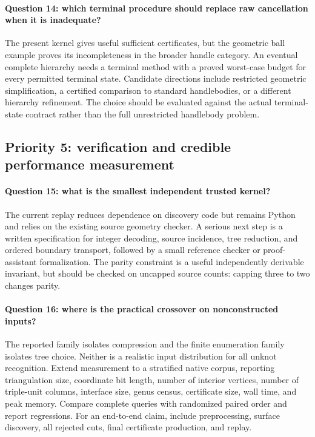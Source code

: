 \paragraph{Question 14: which terminal procedure should replace raw
cancellation when it is inadequate?}
The present kernel gives useful sufficient certificates, but the geometric
ball example proves its incompleteness in the broader handle category.
An eventual complete hierarchy needs a terminal method with a proved
worst-case budget for every permitted terminal state.  Candidate directions
include restricted geometric simplification, a certified comparison to
standard handlebodies, or a different hierarchy refinement.  The choice
should be evaluated against the actual terminal-state contract rather
than the full unrestricted handlebody problem.

\subsection{Priority 5: verification and credible performance measurement}
\paragraph{Question 15: what is the smallest independent trusted kernel?}
The current replay reduces dependence on discovery code but remains Python
and relies on the existing source geometry checker.  A serious next step
is a written specification for integer decoding, source incidence,
tree reduction, and ordered boundary transport, followed by a small
reference checker or proof-assistant formalization.  The parity constraint
is a useful independently derivable invariant, but should be checked on
uncapped source counts: capping three to two changes parity.

\paragraph{Question 16: where is the practical crossover on nonconstructed
inputs?}
The reported family isolates compression and the finite enumeration
family isolates tree choice.  Neither is a realistic input distribution
for all unknot recognition.  Extend measurement to a stratified native
corpus, reporting triangulation size, coordinate bit length, number of
interior vertices, number of triple-unit columns, interface size, genus
census, certificate size, wall time, and peak memory.  Compare complete
queries with randomized paired order and report regressions.  For an
end-to-end claim, include preprocessing, surface discovery, all rejected
cuts, final certificate production, and replay.

